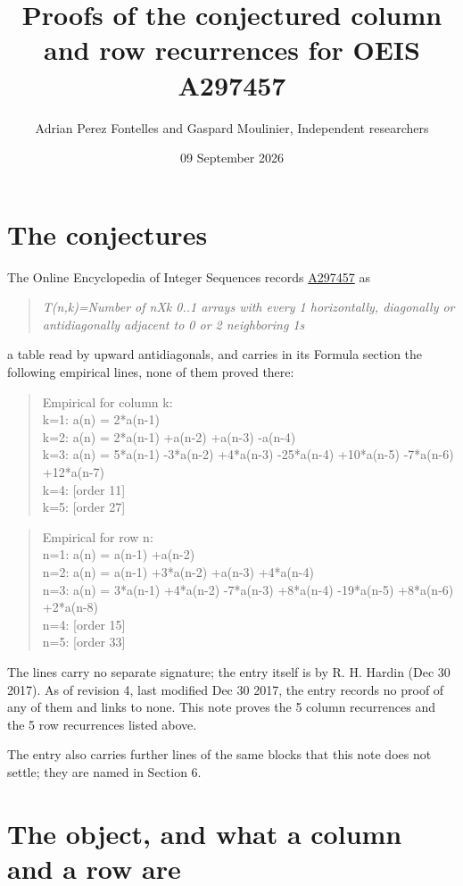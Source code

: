 \documentclass[11pt]{article}
\title{Proofs of the conjectured column and row recurrences for OEIS A297457}
\author{Adrian Perez Fontelles and Gaspard Moulinier, Independent researchers}
\date{09 September 2026}
\theoremstyle{definition}
\begin{document}
\maketitle
\section{The conjectures}

The Online Encyclopedia of Integer Sequences records \href{https://oeis.org/A297457}{A297457} as

\begin{quote}\itshape T(n,k)=Number of nXk 0..1 arrays with every 1 horizontally, diagonally or antidiagonally adjacent to 0 or 2 neighboring 1s\end{quote}

a table read by upward antidiagonals, and carries in its Formula section the following empirical lines, none of them proved there:

\begin{quote}\ttfamily Empirical for column k:\\
k=1: a(n) = 2*a(n-1)\\k=2: a(n) = 2*a(n-1) +a(n-2) +a(n-3) -a(n-4)\\k=3: a(n) = 5*a(n-1) -3*a(n-2) +4*a(n-3) -25*a(n-4) +10*a(n-5) -7*a(n-6) +12*a(n-7)\\k=4: [order 11]\\k=5: [order 27]\end{quote}

\begin{quote}\ttfamily Empirical for row n:\\
n=1: a(n) = a(n-1) +a(n-2)\\n=2: a(n) = a(n-1) +3*a(n-2) +a(n-3) +4*a(n-4)\\n=3: a(n) = 3*a(n-1) +4*a(n-2) -7*a(n-3) +8*a(n-4) -19*a(n-5) +8*a(n-6) +2*a(n-8)\\n=4: [order 15]\\n=5: [order 33]\end{quote}

The lines carry no separate signature; the entry itself is by R. H. Hardin (Dec 30 2017). As of revision 4, last modified Dec 30 2017, the entry records no proof of any of them and links to none. This note proves the 5 column recurrences and the 5 row recurrences listed above.

The entry also carries further lines of the same blocks that this note does not settle; they are named in Section 6.

\section{The object, and what a column and a row are}
\end{document}
